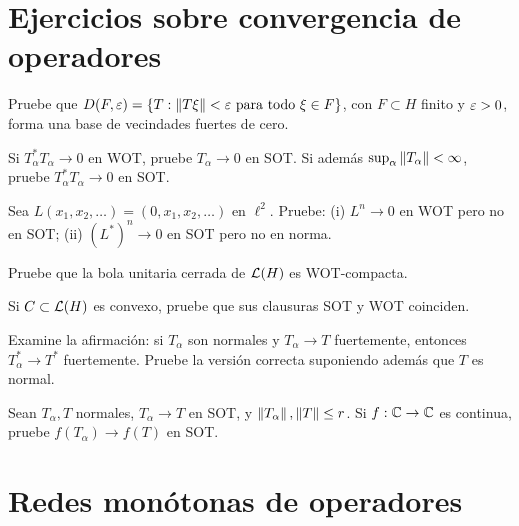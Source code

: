 \section{Ejercicios sobre convergencia de operadores}

\begin{ejercicio}\label{ej:v3-l31-1}
Pruebe que $D(F,\varepsilon)=\{T:\left\lVert T\xi\right\rVert<\varepsilon\text{ para todo }\xi\in F\}$, con $F\subset H$ finito y $\varepsilon>0$, forma una base de vecindades fuertes de cero.
\end{ejercicio}


\begin{ejercicio}\label{ej:v3-l31-2}
Si $T_\alpha^*T_\alpha\to0$ en WOT, pruebe $T_\alpha\to0$ en SOT. Si además $\sup_\alpha\left\lVert T_\alpha\right\rVert<\infty$, pruebe $T_\alpha^*T_\alpha\to0$ en SOT.
\end{ejercicio}


\begin{ejercicio}\label{ej:v3-l31-3}
Sea $L(x_1,x_2,\ldots)=(0,x_1,x_2,\ldots)$ en $\ell^2$. Pruebe: (i) $L^n\to0$ en WOT pero no en SOT; (ii) $(L^*)^n\to0$ en SOT pero no en norma.
\end{ejercicio}


\begin{ejercicio}\label{ej:v3-l31-4}
Pruebe que la bola unitaria cerrada de $\mathcal L(H)$ es WOT-compacta.
\end{ejercicio}


\begin{ejercicio}\label{ej:v3-l31-5}
Si $C\subset\mathcal L(H)$ es convexo, pruebe que sus clausuras SOT y WOT coinciden.
\end{ejercicio}


\begin{ejercicio}\label{ej:v3-l31-6}
Examine la afirmación: si $T_\alpha$ son normales y $T_\alpha\to T$ fuertemente, entonces $T_\alpha^*\to T^*$ fuertemente. Pruebe la versión correcta suponiendo además que $T$ es normal.
\end{ejercicio}


\begin{ejercicio}\label{ej:v3-l31-7}
Sean $T_\alpha,T$ normales, $T_\alpha\to T$ en SOT, y $\left\lVert T_\alpha\right\rVert,\left\lVert T\right\rVert\le r$. Si $f:\mathbb C\to\mathbb C$ es continua, pruebe $f(T_\alpha)\to f(T)$ en SOT.
\end{ejercicio}


\section{Redes monótonas de operadores}\label{lec:v3-32}

